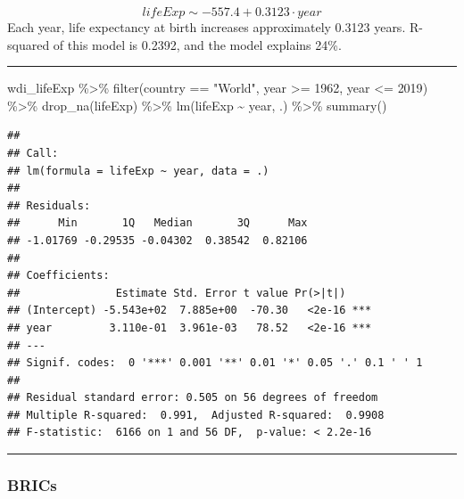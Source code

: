 \documentclass[
]{article}
\newenvironment{Shaded}{\begin{snugshade}}{\end{snugshade}}
\newcommand{\DecValTok}[1]{\textcolor[rgb]{0.00,0.00,0.81}{#1}}
\newcommand{\FunctionTok}[1]{\textcolor[rgb]{0.00,0.00,0.00}{#1}}
\newcommand{\NormalTok}[1]{#1}
\newcommand{\SpecialCharTok}[1]{\textcolor[rgb]{0.00,0.00,0.00}{#1}}
\newcommand{\StringTok}[1]{\textcolor[rgb]{0.31,0.60,0.02}{#1}}
\begin{document}
\[lifeExp \sim -557.4 + 0.3123 \cdot year\] Each year, life expectancy
at birth increases approximately 0.3123 years. R-squared of this model
is 0.2392, and the model explains 24\%.

\begin{center}\rule{0.5\linewidth}{0.5pt}\end{center}

\begin{Shaded}
\begin{Highlighting}[]
\NormalTok{wdi\_lifeExp }\SpecialCharTok{\%\textgreater{}\%} \FunctionTok{filter}\NormalTok{(country }\SpecialCharTok{==} \StringTok{"World"}\NormalTok{, year }\SpecialCharTok{\textgreater{}=} \DecValTok{1962}\NormalTok{, year }\SpecialCharTok{\textless{}=} \DecValTok{2019}\NormalTok{) }\SpecialCharTok{\%\textgreater{}\%} \FunctionTok{drop\_na}\NormalTok{(lifeExp) }\SpecialCharTok{\%\textgreater{}\%} \FunctionTok{lm}\NormalTok{(lifeExp }\SpecialCharTok{\textasciitilde{}}\NormalTok{ year, .) }\SpecialCharTok{\%\textgreater{}\%} \FunctionTok{summary}\NormalTok{()}
\end{Highlighting}
\end{Shaded}

\begin{verbatim}
## 
## Call:
## lm(formula = lifeExp ~ year, data = .)
## 
## Residuals:
##      Min       1Q   Median       3Q      Max 
## -1.01769 -0.29535 -0.04302  0.38542  0.82106 
## 
## Coefficients:
##               Estimate Std. Error t value Pr(>|t|)    
## (Intercept) -5.543e+02  7.885e+00  -70.30   <2e-16 ***
## year         3.110e-01  3.961e-03   78.52   <2e-16 ***
## ---
## Signif. codes:  0 '***' 0.001 '**' 0.01 '*' 0.05 '.' 0.1 ' ' 1
## 
## Residual standard error: 0.505 on 56 degrees of freedom
## Multiple R-squared:  0.991,  Adjusted R-squared:  0.9908 
## F-statistic:  6166 on 1 and 56 DF,  p-value: < 2.2e-16
\end{verbatim}

\begin{center}\rule{0.5\linewidth}{0.5pt}\end{center}

\hypertarget{brics}{%
\subsubsection{BRICs}\label{brics}}
\end{document}
